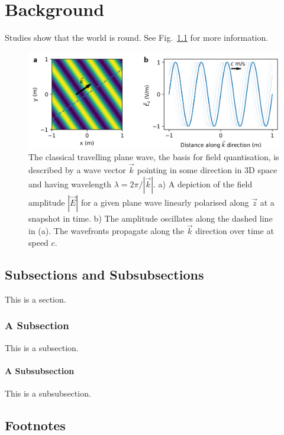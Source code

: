 \chapter{Background}
\blindtext

Studies show that the world is round\cite{Einstein1905}. See Fig.~\ref{fig:travelling plane wave} for more information.

\begin{figure}
    \centering
    \includegraphics[width=\linewidth]{chap2/images/travelling plane wave.png}
    \caption{The classical travelling plane wave, the basis for field quantisation, is described by a wave vector $\vec{k}$ pointing in some direction in 3D space and having wavelength $\lambda = 2 \pi / |\vec{k}|$. a) A depiction of the field amplitude $|\vec{E}|$ for a given plane wave linearly polarised along $\vec{z}$ at a snapshot in time. b) The amplitude oscillates along the dashed line in (a). The wavefronts propagate along the $\vec{k}$ direction over time at speed $c$.}
    \label{fig:travelling plane wave}
\end{figure}

\section{Subsections and Subsubsections}

This is a section.

\subsection{A Subsection}

This is a subsection.

\subsubsection{A Subsubsection}

This is a subsubsection.

\section{Footnotes}

